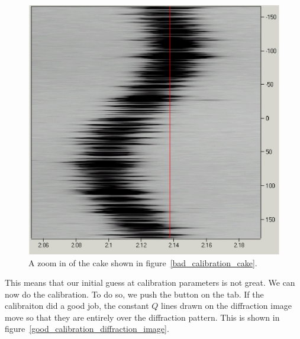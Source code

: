 \begin{figure}[h]
    \centering
    \includegraphics[scale=.75]{figures/bad_calibration_cake_zoom.eps}
    \caption{A zoom in of the cake shown in 
    figure~\ref{bad_calibration_cake}.}
    \label{bad_calibration_cake_zoom}
\end{figure}

This means that our initial guess at 
calibration parameters is not great.
We can now do the calibration. To do so, we push
the  button on the 
tab. If the calibraiton did a good job, the constant
$Q$ lines drawn on the diffraction image move
so that they are entirely over the diffraction 
pattern. This is shown in 
figure~\ref{good_calibration_diffraction_image}.

